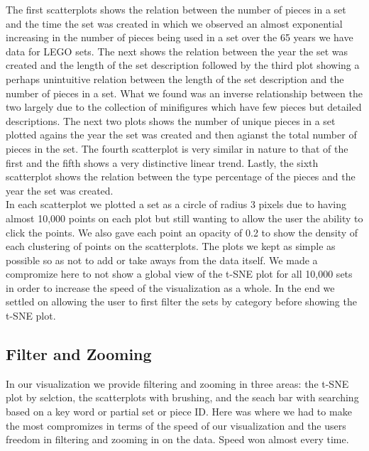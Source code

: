 \documentclass[a4paper, 12pt]{article}
\begin{document}
The first scatterplots shows the relation between the number of pieces in a set and the time the set was created in which we observed an almost exponential increasing in the number of pieces being used in a set over the 65 years we have data for LEGO sets. The next shows the relation between the year the set was created and the length of the set description followed by the third plot showing a perhaps unintuitive relation between the length of the set description and the number of pieces in a set. What we found was an inverse relationship between the two largely due to the collection of minifigures which have few pieces but detailed descriptions. The next two plots shows the number of unique pieces in a set plotted agains the year the set was created  and  then agianst the total number of pieces in the set. The fourth scatterplot is very similar in nature to that of the first and the fifth shows a very distinctive linear trend. Lastly, the sixth scatterplot shows the relation between the type percentage of the pieces and the year the set was created. \\

In each scatterplot we plotted a set as a circle of radius 3 pixels  due to having almost 10,000 points on each plot but still wanting to allow the user the ability to click the points. We also gave each point an  opacity of 0.2 to show the density of each clustering of points on the scatterplots. The plots we kept as simple as possible so as not to add or take aways from the data itself. We made a compromize here to not show a global view of the t-SNE plot for all 10,000 sets in order to increase the speed of the visualization as a whole. In the end we settled on allowing the user to first filter the sets by category before showing the t-SNE plot.

\subsection*{Filter and Zooming}

In our visualization we provide filtering and zooming in three areas: the t-SNE plot by selction, the scatterplots with brushing, and the seach bar with searching based on a key word or partial set or piece ID. Here was where we had to make the most compromizes in terms of the speed of our visualization and the users freedom in filtering and zooming in on the data. Speed won almost every time.\\
\end{document}
